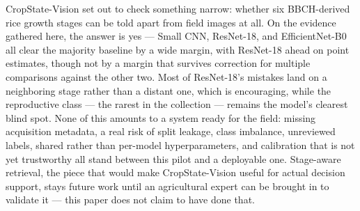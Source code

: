 \documentclass{llncs}
\begin{document}
CropState-Vision set out to check something narrow: whether six BBCH-derived rice growth stages can be told apart from field images at all. On the evidence gathered here, the answer is yes — Small CNN, ResNet-18, and EfficientNet-B0 all clear the majority baseline by a wide margin, with ResNet-18 ahead on point estimates, though not by a margin that survives correction for multiple comparisons against the other two. Most of ResNet-18's mistakes land on a neighboring stage rather than a distant one, which is encouraging, while the reproductive class — the rarest in the collection — remains the model's clearest blind spot. None of this amounts to a system ready for the field: missing acquisition metadata, a real risk of split leakage, class imbalance, unreviewed labels, shared rather than per-model hyperparameters, and calibration that is not yet trustworthy all stand between this pilot and a deployable one. Stage-aware retrieval, the piece that would make CropState-Vision useful for actual decision support, stays future work until an agricultural expert can be brought in to validate it — this paper does not claim to have done that.



\end{document}
